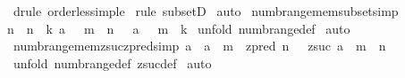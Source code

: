 \begin{isabellebody}
%
\isadelimproof
%
\endisadelimproof
%
\isatagproof
{}\isamarkupfalse%
\ {\isacharparenleft}drule\ order{\isacharunderscore}less{\isacharunderscore}imp{\isacharunderscore}le{\isacharparenright}\isanewline
{}\isamarkupfalse%
\ {\isacharparenleft}rule\ subsetD{\isacharparenright}\isanewline
{}\isamarkupfalse%
\ auto\isanewline
{}\isamarkupfalse%
%
\endisatagproof
{\isafoldproof}%
%
\isadelimproof
\isanewline
%
\endisadelimproof
\isanewline
\isanewline
{}\isamarkupfalse%
\ numb{\isacharunderscore}range{\isacharunderscore}mem{\isacharunderscore}subset{}{\isacharbrackleft}simp{\isacharbrackright}{\isacharcolon}\ \isanewline
{\isachardoublequoteopen}{\isacharbang}{\isacharbang}n{\isachardot}\ {\isacharbrackleft}{\isacharbar}\ n\ {\isacharless}{\isacharequal}\ k{\isacharsemicolon}\ a\ {\isacharcolon}\ {\isacharparenleft}\ m\ {\isachardot}{\isachardot}\ n{\isacharparenright}\ {\isacharbar}{\isacharbrackright}\ {\isacharequal}{\isacharequal}{\isachargreater}\ a\ {\isacharcolon}\ {\isacharparenleft}\ m\ {\isachardot}{\isachardot}\ k{\isacharparenright}{\isachardoublequoteclose}\isanewline
%
\isadelimproof
%
\endisadelimproof
%
\isatagproof
{}\isamarkupfalse%
\ {\isacharparenleft}unfold\ numb{\isacharunderscore}range{\isacharunderscore}def{\isacharparenright}\isanewline
{}\isamarkupfalse%
\ auto\isanewline
{}\isamarkupfalse%
%
\endisatagproof
{\isafoldproof}%
%
\isadelimproof
\isanewline
%
\endisadelimproof
\isanewline
\isanewline
{}\isamarkupfalse%
\ numb{\isacharunderscore}range{\isacharunderscore}mem{\isacharunderscore}zsuc{\isacharunderscore}zpred{\isacharbrackleft}simp{\isacharbrackright}{\isacharcolon}\ {\isachardoublequoteopen}{\isacharbang}{\isacharbang}a{\isachardot}\ {\isacharbrackleft}{\isacharbar}\ a\ {\isacharcolon}\ {\isacharparenleft}m\ {\isachardot}{\isachardot}\ zpred\ n{\isacharparenright}\ {\isacharbar}{\isacharbrackright}\ {\isacharequal}{\isacharequal}{\isachargreater}\ {\isacharparenleft}zsuc\ a\ {\isacharcolon}\ {\isacharparenleft}m\ {\isachardot}{\isachardot}\ n{\isacharparenright}{\isacharparenright}{\isachardoublequoteclose}\isanewline
%
\isadelimproof
%
\endisadelimproof
%
\isatagproof
{}\isamarkupfalse%
\ {\isacharparenleft}unfold\ numb{\isacharunderscore}range{\isacharunderscore}def\ zsuc{\isacharunderscore}def{\isacharparenright}\isanewline
{}\isamarkupfalse%
\ auto\isanewline
{}\isamarkupfalse%
%
\endisatagproof
{\isafoldproof}%
%
\isadelimproof

\end{isabellebody}
